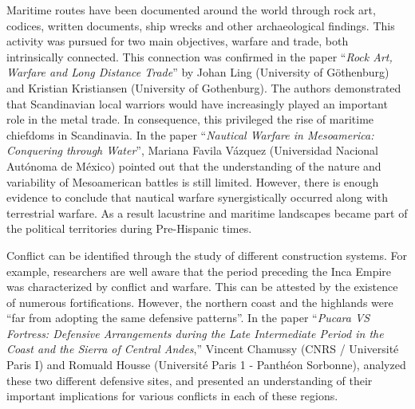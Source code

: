 
Maritime routes have been documented around the world through rock art, codices, written documents, ship wrecks and other archaeological findings. This activity was pursued for two main objectives, warfare and trade, both intrinsically connected. This connection was confirmed in the paper “\textit{Rock Art, Warfare and Long Distance Trade}” by Johan Ling (University of Göthenburg) and Kristian Kristiansen (University of Gothenburg). The authors demonstrated that Scandinavian local warriors would have increasingly played an important role in the metal trade. In consequence, this privileged the rise of maritime chiefdoms in Scandinavia. In the paper “\textit{Nautical Warfare in Mesoamerica: Conquering through Water}”, Mariana Favila Vázquez (Universidad Nacional Autónoma de México) pointed out that the understanding of the nature and variability of Mesoamerican battles is still limited. However, there is enough evidence to conclude that nautical warfare synergistically occurred along with terrestrial warfare. As a result lacustrine and maritime landscapes became part of the political territories during Pre-Hispanic times. 


Conflict can be identified through the study of different construction systems. For example, researchers are well aware that the period preceding the Inca Empire was characterized by conflict and warfare. This can be attested by the existence of numerous fortifications. However, the northern coast and the highlands were “far from adopting the same defensive patterns”. In the paper “\textit{Pucara VS Fortress: Defensive Arrangements during the Late Intermediate Period in the Coast and the Sierra of Central Andes},” Vincent Chamussy (CNRS / Université Paris I) and Romuald Housse (Université Paris 1 - Panthéon Sorbonne), analyzed these two different defensive sites, and presented an understanding of their important implications for various conflicts in each of these regions. 

